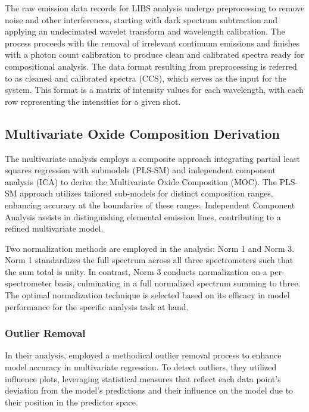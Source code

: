 The raw emission data records for LIBS analysis undergo preprocessing to remove noise and other interferences, starting with dark spectrum subtraction and applying an undecimated wavelet transform and wavelength calibration.
The process proceeds with the removal of irrelevant continuum emissions and finishes with a photon count calibration to produce clean and calibrated spectra ready for compositional analysis.
The data format resulting from preprocessing is referred to as cleaned and calibrated spectra (CCS), which serves as the input for the system.
This format is a matrix of intensity values for each wavelength, with each row representing the intensities for a given shot.


\subsection{Multivariate Oxide Composition Derivation}\label{sec:moc_derivation}

The multivariate analysis employs a composite approach integrating partial least squares regression with submodels (PLS-SM) and independent component analysis (ICA) to derive the Multivariate Oxide Composition (MOC).
The PLS-SM approach utilizes tailored sub-models for distinct composition ranges, enhancing accuracy at the boundaries of these ranges.
Independent Component Analysis assists in distinguishing elemental emission lines, contributing to a refined multivariate model.

Two normalization methods are employed in the analysis: Norm 1 and Norm 3.
Norm 1 standardizes the full spectrum across all three spectrometers such that the sum total is unity.
In contrast, Norm 3 conducts normalization on a per-spectrometer basis, culminating in a full normalized spectrum summing to three.
The optimal normalization technique is selected based on its efficacy in model performance for the specific analysis task at hand.

\subsubsection{Outlier Removal}\label{sec:outlier_removal}

In their analysis, \citet{andersonImprovedAccuracyQuantitative2017} employed a methodical outlier removal process to enhance model accuracy in multivariate regression. To detect outliers, they utilized influence plots, leveraging statistical measures that reflect each data point's deviation from the model's predictions and their influence on the model due to their position in the predictor space.

